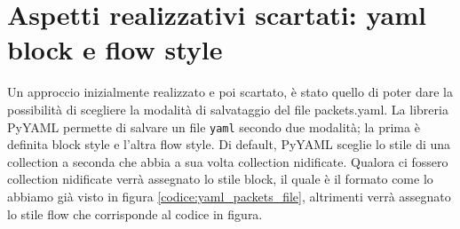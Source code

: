 \documentclass[binding=0.6cm]{sapthesis}
\begin{document}
 \section{Aspetti realizzativi scartati: yaml block e flow style}
 \label{sec:aspetti_realizzativi_scartati}
 Un approccio inizialmente realizzato e poi scartato, è stato quello di poter dare la possibilità di scegliere la modalità di salvataggio del file packets.yaml.
La libreria PyYAML permette di salvare un file \texttt{yaml} secondo due modalità; la prima è definita block style e l'altra flow style.
Di default, PyYAML sceglie lo stile di una collection a seconda che abbia a sua volta collection nidificate. Qualora ci fossero collection nidificate
verrà assegnato lo stile block, il quale è il formato come lo abbiamo già visto in figura \ref{codice:yaml_packets_file}, altrimenti verrà assegnato
lo stile flow che corrisponde al codice in figura.
\end{document}
